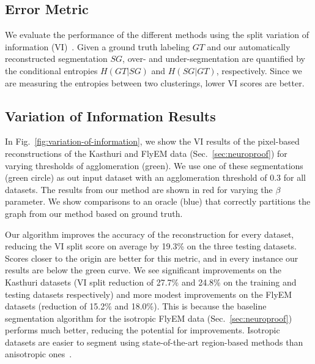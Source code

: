 
\subsection{Error Metric}
\label{sec:variation-of-information}

We evaluate the performance of the different methods using the split variation of information (VI)~\cite{meila2003comparing}.
Given a ground truth labeling $GT$ and our automatically reconstructed segmentation $SG$, over- and under-segmentation are quantified by the conditional entropies $H(GT | SG)$ and $H(SG | GT)$, respectively. Since we are measuring the entropies between two clusterings, lower VI scores are better.

\subsection{Variation of Information Results}

In Fig.~\ref{fig:variation-of-information}, we show the VI results of the pixel-based reconstructions of the Kasthuri and FlyEM data (Sec.~\ref{sec:neuroproof}) for varying thresholds of agglomeration (green). We use one of these segmentations (green circle) as out input dataset with an agglomeration threshold of 0.3 for all datasets. The results from our method are shown in red for varying the $\beta$ parameter. We show comparisons to an oracle (blue) that correctly partitions the graph from our method based on ground truth.

Our algorithm improves the accuracy of the reconstruction for every dataset, reducing the VI split score on average by 19.3\% on the three testing datasets. 
Scores closer to the origin are better for this metric, and in every instance our results are below the green curve.
We see significant improvements on the Kasthuri datasets (VI split reduction of 27.7\% and 24.8\% on the training and testing datasets respectively) and more modest improvements on the FlyEM datasets (reduction of 15.2\% and 18.0\%). This is because the baseline segmentation algorithm for the isotropic FlyEM data (Sec.~\ref{sec:neuroproof}) performs much better, reducing the potential for improvements. Isotropic datasets are easier to segment using state-of-the-art region-based methods than anisotropic ones~\cite{plaza2014annotating}.

